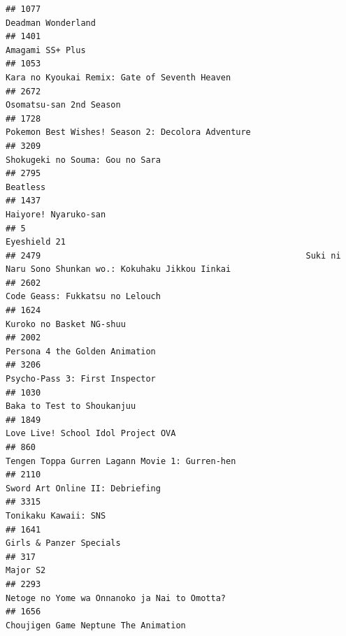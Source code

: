 \documentclass[
]{article}
\begin{document}
\begin{verbatim}
## 1077                                                                                        Deadman Wonderland
## 1401                                                                                          Amagami SS+ Plus
## 1053                                                             Kara no Kyoukai Remix: Gate of Seventh Heaven
## 2672                                                                                   Osomatsu-san 2nd Season
## 1728                                                         Pokemon Best Wishes! Season 2: Decolora Adventure
## 3209                                                                           Shokugeki no Souma: Gou no Sara
## 2795                                                                                                  Beatless
## 1437                                                                                      Haiyore! Nyaruko-san
## 5                                                                                                 Eyeshield 21
## 2479                                                     Suki ni Naru Sono Shunkan wo.: Kokuhaku Jikkou Iinkai
## 2602                                                                           Code Geass: Fukkatsu no Lelouch
## 1624                                                                                  Kuroko no Basket NG-shuu
## 2002                                                                            Persona 4 the Golden Animation
## 3206                                                                            Psycho-Pass 3: First Inspector
## 1030                                                                                Baka to Test to Shoukanjuu
## 1849                                                                        Love Live! School Idol Project OVA
## 860                                                             Tengen Toppa Gurren Lagann Movie 1: Gurren-hen
## 2110                                                                           Sword Art Online II: Debriefing
## 3315                                                                                      Tonikaku Kawaii: SNS
## 1641                                                                                   Girls & Panzer Specials
## 317                                                                                                   Major S2
## 2293                                                              Netoge no Yome wa Onnanoko ja Nai to Omotta?
## 1656                                                                      Choujigen Game Neptune The Animation

\end{verbatim}
\end{document}
